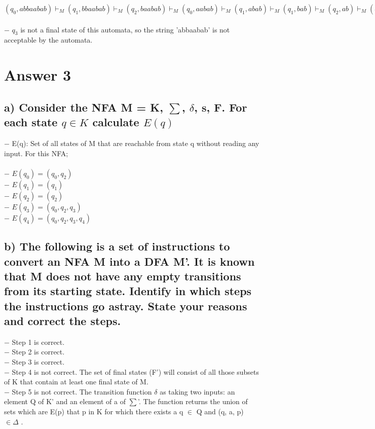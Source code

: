 \documentclass[12pt]{article}
\begin{document}
$(q_0,abbaabab) \vdash_M (q_1,bbaabab) \vdash_M (q_2,baabab) \vdash_M (q_0,aabab) \vdash_M (q_1,abab) \vdash_M (q_1,bab) \vdash_M (q_2,ab) \vdash_M (q_3,b) \vdash_M (q_3,e)$ \\
\\
$-$ $q_3$ is not a final state of this automata, so the string 'abbaabab' is not acceptable by the automata.

\section*{Answer 3}

\subsection*{a) Consider the NFA M = {K, $\sum$, $\delta$, s, F}. For each state $q \in K$ calculate $E(q)$ } 

$-$ E(q): Set of all states of M that are reachable from state q without reading any input. For this NFA; \\
\\
$-$ $E(q_0) = (q_0, q_2)$\\
$-$ $E(q_1) = (q_1)$\\
$-$ $E(q_2) = (q_2)$\\
$-$ $E(q_3) = (q_0, q_2, q_3)$\\
$-$ $E(q_4) = (q_0, q_2, q_3, q_4)$\\

\subsection*{b) The following is a set of instructions to convert an NFA M into a DFA M'. It is
known that M does not have any empty transitions from its starting state. Identify in which steps the
instructions go astray. State your reasons and correct the steps. } 

$-$ Step 1 is correct. \\
$-$ Step 2 is correct. \\
$-$ Step 3 is correct. \\
$-$ Step 4 is not correct. The set of final states (F') will consist of all those subsets of K that contain at least one final state of M. \\
$-$ Step 5 is not correct. The transition function $\delta$ as taking two inputs: an element Q of K' and an element of a of
$\sum$'. The function returns the union of sets which are E(p) that p in K for which there exists a q $\in$ Q and (q, a, p) $\in \Delta$ . \\
\end{document}
